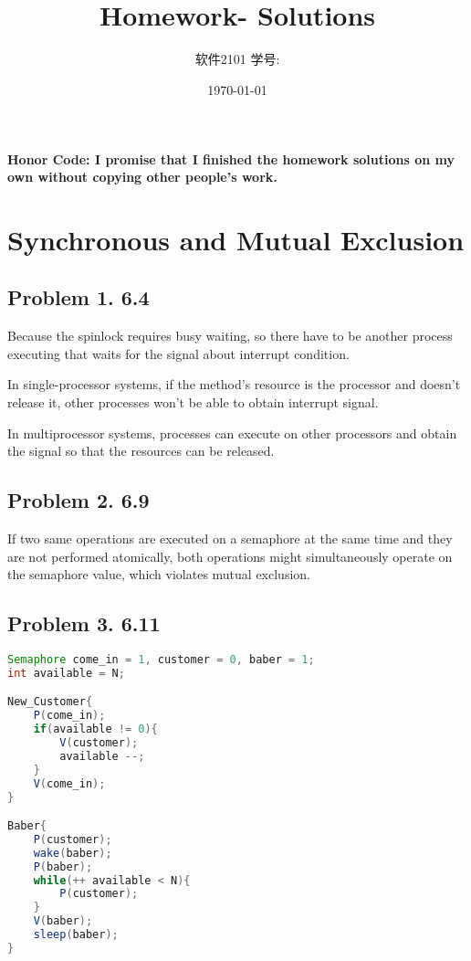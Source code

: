 \documentclass[11pt]{article}
\title{\vspace{-4cm}\CourseCodeName \space
        \Session \protect\\  Homework-\textbf{\Homework} Solutions}
\author{软件2101 \Name \space 学号: \SID}
\date{\today}
\begin{document}
\maketitle
\vspace{-0.8cm}
\textbf{Honor Code: I promise that I finished the homework solutions on my own without copying other people's 
    work.}

\section*{Synchronous and Mutual Exclusion}

\subsection*{Problem 1. 6.4}
Because the spinlock requires busy waiting, so there have to be another process executing that waits for the signal about interrupt condition.

In single-processor systems, if the method's resource is the processor and doesn't release it, other processes won't be able to obtain 
interrupt signal.

In multiprocessor systems, processes can execute on other processors and obtain the signal so that the resources can be released.

\subsection*{Problem 2. 6.9}

If two same operations are executed on a semaphore at the same time and they
are not performed atomically, both operations might simultaneously operate on the semaphore value, which violates mutual exclusion. 

\subsection*{Problem 3. 6.11}

\begin{lstlisting}[language = Java]
Semaphore come_in = 1, customer = 0, baber = 1;
int available = N;

New_Customer{
    P(come_in);
    if(available != 0){
        V(customer);
        available --;
    }
    V(come_in);
}

Baber{
    P(customer);
    wake(baber);
    P(baber);
    while(++ available < N){
        P(customer);
    }
    V(baber);
    sleep(baber);
}
\end{lstlisting}
\end{document}
